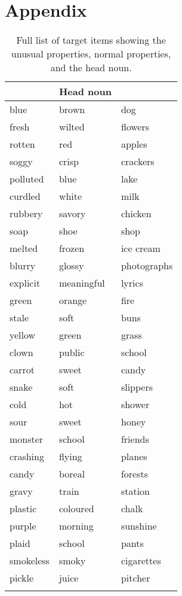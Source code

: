 \documentclass[output=paper]{langsci/langscibook}
\begin{document}
\clearpage
\section*{Appendix}

\begin{table}
  \caption{Full list of target items showing the unusual properties,
    normal properties, and the head noun.}
  \label{tab:}

  \begin{tabular}{lll}
    \lsptoprule
    \multicolumn{2}{l}{Properties} & Head noun \\ \midrule
    
    blue & brown & dog\\
    fresh & wilted & flowers\\
    rotten & red & apples\\
    soggy & crisp & crackers\\
    polluted & blue & lake\\
    curdled & white & milk\\
    rubbery & savory & chicken\\
    soap & shoe & shop\\
    melted & frozen & ice cream\\
    blurry & glossy & photographs\\
    explicit & meaningful & lyrics\\
    green & orange & fire\\
    stale & soft & buns\\
    yellow & green & grass\\
    clown & public & school\\
    carrot & sweet & candy\\
    snake & soft & slippers\\
    cold & hot & shower\\
    sour & sweet & honey\\
    monster & school & friends\\
    crashing & flying & planes\\
    candy & boreal & forests\\
    gravy & train & station\\
    plastic & coloured & chalk\\
    purple & morning & sunshine\\
    plaid & school & pants\\
    smokeless & smoky & cigarettes\\
    pickle & juice & pitcher\\
    \lspbottomrule
  \end{tabular}
\end{table}
\end{document}

